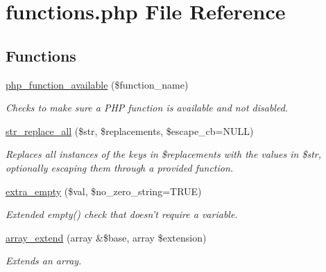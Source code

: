 \hypertarget{functions_8php}{\section{functions.\-php File Reference}
\label{functions_8php}
}
\subsection*{Functions}
\begin{DoxyCompactItemize}
\item 
\hyperlink{functions_8php_af046064a94a452746f8ee2d5417066ec}{php\-\_\-function\-\_\-available} (\$function\-\_\-name)
\begin{DoxyCompactList}\small\item\em Checks to make sure a P\-H\-P function is available and not disabled. \end{DoxyCompactList}\item 
\hyperlink{functions_8php_a204c6a85390da62a3ce99a791c865a9b}{str\-\_\-replace\-\_\-all} (\$str, \$replacements, \$escape\-\_\-cb=N\-U\-L\-L)
\begin{DoxyCompactList}\small\item\em Replaces all instances of the keys in \$replacements with the values in \$str, optionally escaping them through a provided function. \end{DoxyCompactList}\item 
\hyperlink{functions_8php_a3cce2993eccf4627f7d607d62f63df60}{extra\-\_\-empty} (\$val, \$no\-\_\-zero\-\_\-string=T\-R\-U\-E)
\begin{DoxyCompactList}\small\item\em Extended empty() check that doesn't require a variable. \end{DoxyCompactList}\item 
\hyperlink{functions_8php_a7232b02d8ee62e9d1f6e57573b6c1df6}{array\-\_\-extend} (array \&\$base, array \$extension)
\begin{DoxyCompactList}\small\item\em Extends an array. \end{DoxyCompactList}\end{DoxyCompactItemize}


